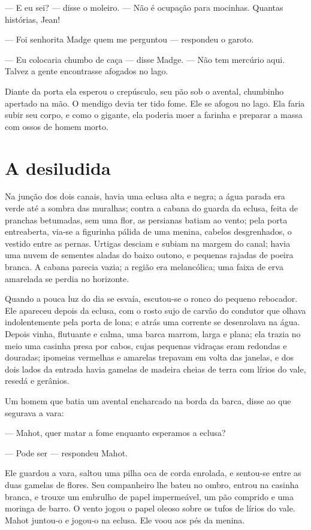 --- E eu sei? --- disse o moleiro. --- Não é ocupação para mocinhas. Quantas
histórias, Jean!

--- Foi senhorita Madge quem me perguntou --- respondeu o garoto.

--- Eu colocaria chumbo de caça --- disse Madge. --- Não tem mercúrio aqui.
Talvez a gente encontrasse afogados no lago.

Diante da porta ela esperou o crepúsculo, seu pão sob o avental,
chumbinho apertado na mão. O mendigo devia ter tido fome. Ele se afogou no
lago. Ela faria subir seu corpo, e como o gigante, ela poderia moer a
farinha e preparar a massa com ossos de homem morto.

\section{A desiludida}

Na junção dos dois canais, havia uma eclusa alta e negra; a água parada
era verde até a sombra das muralhas; contra a cabana do guarda da eclusa,
feita de pranchas betumadas, sem uma flor, as persianas batiam ao vento;
pela porta entreaberta, via-se a figurinha pálida de uma menina, cabelos
desgrenhados, o vestido entre as pernas. Urtigas desciam e subiam na
margem do canal; havia uma nuvem de sementes aladas do baixo outono, e
pequenas rajadas de poeira branca. A cabana parecia vazia; a região era
melancólica; uma faixa de erva amarelada se perdia no horizonte.

Quando a pouca luz do dia se esvaía, escutou-se o ronco do pequeno
rebocador. Ele apareceu depois da eclusa, com o rosto sujo de carvão do
condutor que olhava indolentemente pela porta de lona; e atrás uma
corrente se desenrolava na água. Depois vinha, flutuante e calma, uma
barca marrom, larga e plana; ela trazia no meio uma casinha presa por
cabos, cujas pequenas vidraças eram redondas e douradas; ipomeias
vermelhas e amarelas trepavam em volta das janelas, e dos dois lados da
entrada havia gamelas de madeira cheias de terra com lírios do vale,
resedá e gerânios.

Um homem que batia um avental encharcado na borda da barca, disse ao
que segurava a vara:

--- Mahot, quer matar a fome enquanto esperamos a eclusa?

--- Pode ser --- respondeu Mahot.

Ele guardou a vara, saltou uma pilha oca de corda enrolada, e sentou-se
entre as duas gamelas de flores. Seu companheiro lhe bateu no ombro,
entrou na casinha branca, e trouxe um embrulho de papel impermeável, um
pão comprido e uma moringa de barro. O vento jogou o papel oleoso
sobre os tufos de lírios do vale. Mahot juntou-o e jogou-o na eclusa. Ele
voou aos pés da menina.

